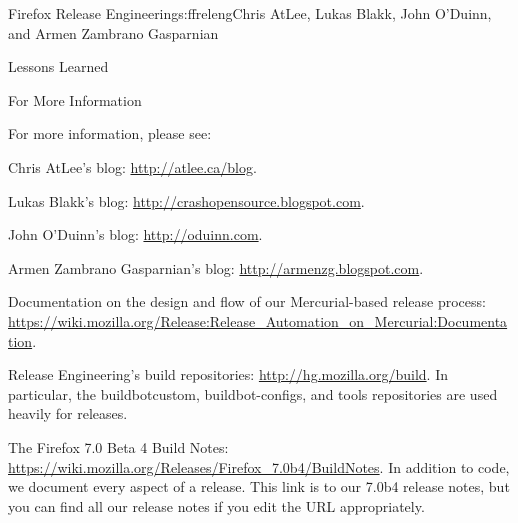 \begin{aosachapter}{Firefox Release Engineering}{s:ffreleng}{Chris AtLee, Lukas Blakk, John O'Duinn, and Armen Zambrano Gasparnian}
\begin{aosasect1}{Lessons Learned}

\begin{aosasect2}{For More Information}

For more information, please see:

\begin{aosaitemize}  

\item Chris AtLee's blog: \url{http://atlee.ca/blog}.

\item Lukas Blakk's blog: \url{http://crashopensource.blogspot.com}.

\item John O'Duinn's blog: \url{http://oduinn.com}.

\item Armen Zambrano Gasparnian's blog: \url{http://armenzg.blogspot.com}.

\item Documentation on the design and flow of our Mercurial-based release process: \url{https://wiki.mozilla.org/Release:Release_Automation_on_Mercurial:Documentation}.

\item Release Engineering's build repositories:
  \url{http://hg.mozilla.org/build}.  In particular, the
  buildbotcustom, buildbot-configs, and tools repositories are used
  heavily for releases.

\item The Firefox 7.0 Beta 4 Build Notes:
  \url{https://wiki.mozilla.org/Releases/Firefox_7.0b4/BuildNotes}.
  In addition to code, we document every aspect of a release. This
  link is to our 7.0b4 release notes, but you can find all our release
  notes if you edit the URL appropriately.

\end{aosaitemize}

\end{aosasect2}

\end{aosasect1}

\end{aosachapter}
